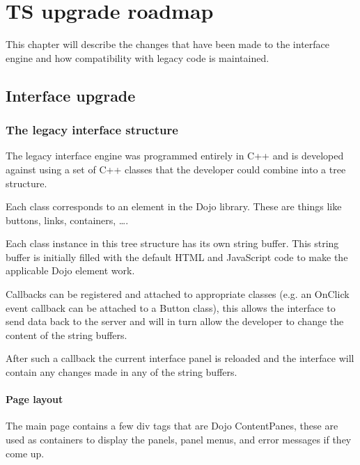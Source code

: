 \chapter{TS upgrade roadmap}
This chapter will describe the changes that have been made to the interface
engine and how compatibility with legacy code is maintained.

\section{Interface upgrade}

\subsection{The legacy interface structure}
The legacy interface engine was programmed entirely in C++ and is developed against
using a set of C++ classes that the developer could combine into a tree structure.

Each class corresponds to an element in the Dojo library. These are things like
buttons, links, containers, \ldots .

Each class instance in this tree structure has its own string buffer.
This string buffer is initially filled with the default HTML and JavaScript code
to make the applicable Dojo element work.

Callbacks can be registered and attached to appropriate classes (e.g. an OnClick
event callback can be attached to a Button class), this allows the interface to
send data back to the server and will in turn allow the developer to change the
content of the string buffers.

After such a callback the current interface panel is reloaded and the interface
will contain any changes made in any of the string buffers.

\subsubsection{Page layout}
The main page contains a few div tags that are Dojo ContentPanes, these are used
as containers to display the panels, panel menus, and error messages if they come up.

